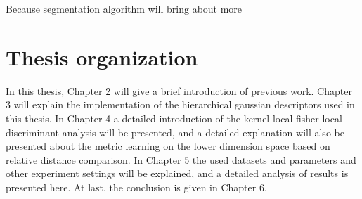 Because segmentation algorithm will bring about more 

\section{Thesis organization}
In this thesis, Chapter 2 will give a brief introduction of previous work. Chapter 3 will explain the implementation of the hierarchical gaussian descriptors used in this thesis. In Chapter 4 a detailed introduction of the kernel local fisher local discriminant analysis will be presented, and a detailed explanation will also be presented about the metric learning on the lower dimension space based on relative distance comparison.
In Chapter 5 the used datasets and parameters and other experiment settings will be explained, and a detailed analysis of results is presented here. At last, the conclusion is given in Chapter 6.




